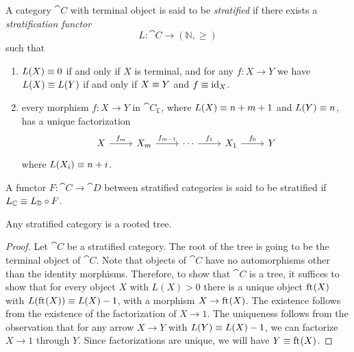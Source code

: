 \begin{defn}
A category $\cat{C}$ with terminal object is said to be \emph{stratified} if there exists a 
\emph{stratification functor}
\begin{equation*}
L : \cat{C}\to (\mathbb{N},\geq)
\end{equation*}
such that
\begin{enumerate}
\item $L(X)\equiv 0$ if and only if $X$ is terminal, and for any $f:X\to Y$ we have
$L(X)\equiv L(Y)$ if and only if $X\equiv Y$ and $f\equiv{\mathrm{id}_{X}}$. 
\item every morphism $f:X\to Y$ in $\cat{C}_\mathbb{E}$, where $L(X)\equiv
n+m+1$ and $L(Y)\equiv n$, has a unique factorization 
\begin{equation*}
\begin{tikzcd}
X \arrow[r,"f_m"] & X_m \arrow[r,"f_{m-1}"] & \cdots \arrow[r,"f_1"] & X_1 \arrow[r,"f_0"] & Y
\end{tikzcd}
\end{equation*}
where $L(X_i)\equiv n+i$.
\end{enumerate}
A functor $F:\cat{C}\to\cat{D}$ between stratified categories is said to be stratified 
if $L_{\mathbb{C}}\equiv L_{\mathbb{D}}\circ F$. 
\end{defn}


\begin{lem}
Any stratified category is a rooted tree.
\end{lem}

\begin{proof}
Let $\cat{C}$ be a stratified category. The root of the tree is going to be the terminal
object of $\cat{C}$. Note that objects of $\cat{C}$ have no automorphisms other
than the identity morphisms. Therefore, to show that $\cat{C}$ is a tree,
it suffices to show that for every object $X$ with $L(X)>0$ there is
a unique object $\mathrm{ft}_{}(X)$ with $L(\mathrm{ft}_{}(X))\equiv L(X)-1$, with a morphism $X\to \mathrm{ft}_{}(X)$.
The existence follows from the existence of the factorization of $X\to 1$. The 
uniqueness follows from the observation that for any arrow
$X\to Y$ with $L(Y)\equiv L(X)-1$, we can factorize $X\to 1$ through $Y$. Since
factorizations are unique, we will have $Y\equiv \mathrm{ft}_{}(X)$. 
\end{proof}

